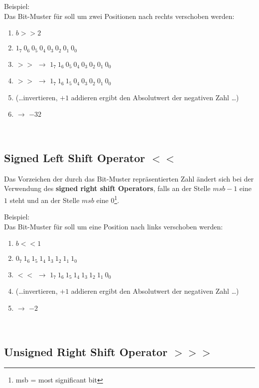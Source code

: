 \noindent
Beispiel:\\
Das Bit-Muster für  soll um zwei Positionen nach rechts verschoben werden:

\begin{enumerate}
    \item[] $b >> 2$
    \item $1_7\ 0_6\ 0_5\ 0_4\ 0_3\ 0_2\ 0_1\ 0_0$
    \item $>>$ $\rightarrow$ $1_7\ 1_6\ 0_5\ 0_4\ 0_3\ 0_2\ 0_1\ 0_0$
    \item $>>$ $\rightarrow$ $1_7\ 1_6\ 1_5\ 0_4\ 0_3\ 0_2\ 0_1\ 0_0$
    \item[] (\ldots invertieren, $+1$ addieren ergibt den Absolutwert der negativen Zahl \ldots)
    \item[]   $\rightarrow$ $-32$
\end{enumerate}\\


\subsection{Signed Left Shift Operator $<<$}


\begin{tcolorbox}
    Das Vorzeichen der durch das Bit-Muster repräsentierten Zahl ändert sich bei der Verwendung des \textbf{signed right shift Operators}, falls an der Stelle $msb - 1$ eine $1$ steht und an der Stelle $msb$ eine $0$\footnote{msb = most significant bit}.
\end{tcolorbox}

\noindent
Beispiel:\\
Das Bit-Muster für  soll um eine Position nach links verschoben werden:

\begin{enumerate}
    \item[] $b << 1$
    \item $0_7\ 1_6\ 1_5\ 1_4\ 1_3\ 1_2\ 1_1\ 1_0$
    \item $<<$ $\rightarrow$ $1_7\ 1_6\ 1_5\ 1_4\ 1_3\ 1_2\ 1_1\ 0_0$
    \item[] (\ldots invertieren, $+1$ addieren ergibt den Absolutwert der negativen Zahl \ldots)
    \item[]   $\rightarrow$ $-2$
\end{enumerate}\\


\subsection{Unsigned Right Shift Operator $>>>$}

